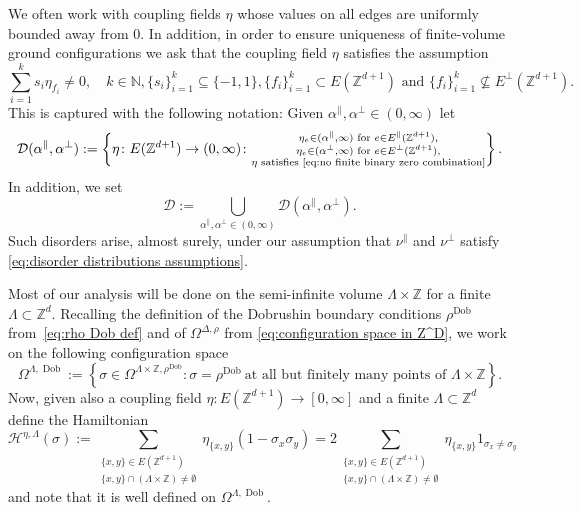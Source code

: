 \documentclass[11pt, reqno]{amsart}
\newcommand{\N}{\mathbb{N}}
\newcommand{\Z}{\mathbb{Z}}
\DeclareMathOperator{\Dob}{Dob}
\numberwithin{equation}{section}
\begin{document}
We often work with coupling fields $\eta$ whose values on all edges are uniformly bounded away from $0$.
In addition, in order to ensure uniqueness of finite-volume ground configurations we ask that the coupling field $\eta$ satisfies the assumption
\begin{equation}\label{eq:no finite binary zero combination}
\sum_{i=1}^k s_i \eta_{f_i}\neq 0,\quad k\in\N, \{s_i\}_{i=1}^k\subseteq\{-1,1\}, \{f_i\}_{i=1}^k\subset E(\Z^{d+1}) \text{ and } \{f_i\}_{i=1}^k \nsubseteq E^\perp(\Z^{d+1}).
\end{equation}
This is captured with the following notation: Given $\alpha^{\parallel},\alpha^{\perp}\in(0,\infty)$ let
\begin{equation}\label{eq:D alpha def}
\mathcal{D}(\alpha^{\parallel},\alpha^{\perp}):=\left\{\eta\colon E(\Z^{d+1})\to(0,\infty)\colon \substack{\eta_e\in(\alpha^{\parallel},
\infty)\text{ for } e\in E^\parallel(\Z^{d+1}),\\
\eta_e\in(\alpha^{\perp},\infty)\text{ for } e\in E^\perp(\Z^{d+1}),\\
\eta \text{ satisfies \eqref{eq:no finite binary zero combination}}} \right\}.
\end{equation}
In addition, we set
\begin{equation}
\mathcal{D}:=\bigcup_{\alpha^{\parallel}, \alpha^{\perp}\in(0,\infty)} \mathcal{D}(\alpha^{\parallel}, \alpha^{\perp}).
\end{equation}
Such disorders arise, almost surely, under our assumption that $\nu^{\parallel}$ and $\nu^{\perp}$ satisfy \eqref{eq:disorder distributions assumptions}.

\smallskip

Most of our analysis will be done on the semi-infinite volume $\Lambda\times\Z$ for a finite $\Lambda\subset\Z^d$. Recalling the definition of the Dobrushin boundary conditions $\rho^{\Dob}$ from~\eqref{eq:rho Dob def} and of $\Omega^{\Delta,\rho}$ from \eqref{eq:configuration space in Z^D}, 
we work on the following configuration space
\begin{equation}\label{eq:Dobrushin space infinite volume}
\Omega^{\Lambda,\Dob}:=\left\{\sigma\in\Omega^{\Lambda\times{\mathbb Z},\rho^{\Dob}}\colon\sigma=\rho^{\Dob}\ \text{at all but finitely many points of $\Lambda\times\Z$} \right\}.
\end{equation}
Now, given also a coupling field $\eta\colon E(\Z^{d+1})\to[0,\infty]$ and a finite $\Lambda\subset\Z^d$ define the Hamiltonian
\begin{equation}\label{eq:Hamiltonian}
\mathcal{H}^{\eta,\Lambda}(\sigma):=\sum_{\substack{\{x,y\}\in E(\Z^{d+1})\\\{x,y\}\cap(\Lambda\times \Z)\neq\emptyset}} \eta_{\{x,y\}}(1-\sigma_x\sigma_y)=2\sum_{\substack{\{x,y\}\in E(\Z^{d+1})\\\{x,y\}\cap(\Lambda\times \Z)\neq\emptyset}} \eta_{\{x,y\}}1_{\sigma_x\neq\sigma_y}
\end{equation}
and note that it is well defined on $\Omega^{\Lambda,\Dob}$. 
\end{document}
